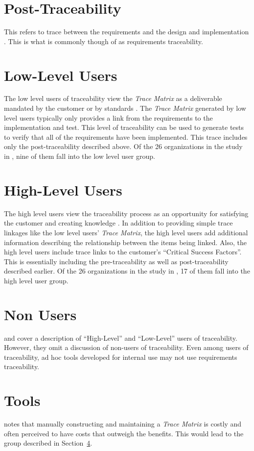 \documentclass[10pt, openany]{report}
\newcommand{\trace}{\emph{Trace Matrix}}
\begin{document}
\section{Post-Traceability}
This refers to trace between the requirements and the design and implementation \cite{req5}.  This is what is commonly though of as requirements traceability.

\section{Low-Level Users}
The low level users of traceability view the \trace{} as a deliverable mandated by the customer or by standards \cite{req2}.  The \trace{} generated by low level users typically only provides a link from the requirements to the implementation and test.  This level of traceability can be used to generate tests to verify that all of the requirements have been implemented.  This trace includes only the post-traceability described above.  Of the 26 organizations in the study in \cite{req2}, nine of them fall into the low level user group.

\section{High-Level Users}
The high level users view the traceability process as an opportunity for satisfying the customer and creating knowledge \cite{req2}.  In addition to providing simple trace linkages like the low level users' \trace{}, the high level users add additional information describing the relationship between the items being linked.  Also, the high level users include trace links to the customer's ``Critical Success Factors''.  This is essentially including the pre-traceability as well as post-traceability described earlier.  Of the 26 organizations in the study in \cite{req2}, 17 of them fall into the high level user group.

\section{Non Users}
\label{sec:Non}
\cite{req2} and \cite{req3} cover a description of ``High-Level'' and ``Low-Level'' users of traceability.  However, they omit a discussion of non-users of traceability.  Even among users of traceability, ad hoc tools developed for internal use may not use requirements traceability.

\section{Tools}
\cite{req6} notes that manually constructing and maintaining a \trace{} is costly and often perceived to have costs that outweigh the benefits.  This would lead to the group described in Section~\ref{sec:Non}.
\end{document}
